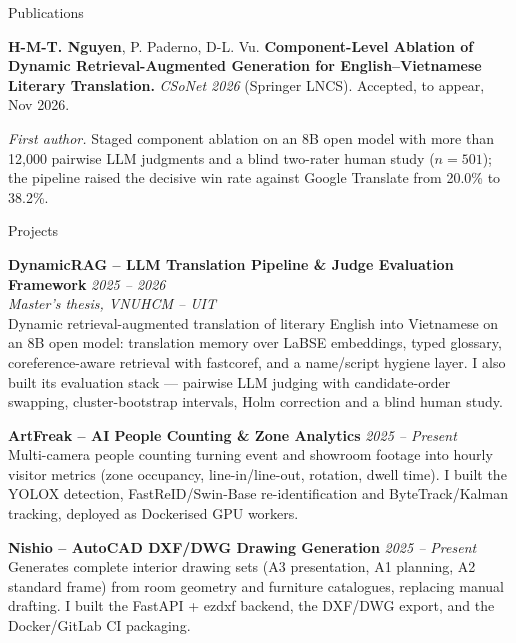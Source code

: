 \documentclass{resume} %
\begin{document}

\begin{rSection}{Publications}

{\bf H-M-T. Nguyen}, P. Paderno, D-L. Vu. \textbf{Component-Level Ablation of Dynamic Retrieval-Augmented Generation for English--Vietnamese Literary Translation.} \textit{CSoNet 2026} (Springer LNCS). Accepted, to appear, Nov 2026.
\smallskip

{\textit{First author.}} Staged component ablation on an 8B open model with more than 12{,}000 pairwise LLM judgments and a blind two-rater human study ($n{=}501$); the pipeline raised the decisive win rate against Google Translate from 20.0\% to 38.2\%.

\end{rSection}


\begin{rSection}{Projects}

{\bf DynamicRAG -- LLM Translation Pipeline \& Judge Evaluation Framework} \hfill {\em 2025 -- 2026} \\
{\textit{Master's thesis, VNUHCM -- UIT}} \\
Dynamic retrieval-augmented translation of literary English into Vietnamese on an 8B open model: translation memory over LaBSE embeddings, typed glossary, coreference-aware retrieval with fastcoref, and a name/script hygiene layer. I also built its evaluation stack --- pairwise LLM judging with candidate-order swapping, cluster-bootstrap intervals, Holm correction and a blind human study.\vspace{0.3em}

{\bf ArtFreak -- AI People Counting \& Zone Analytics} \hfill {\em 2025 -- Present} \\
Multi-camera people counting turning event and showroom footage into hourly visitor metrics (zone occupancy, line-in/line-out, rotation, dwell time). I built the YOLOX detection, FastReID/Swin-Base re-identification and ByteTrack/Kalman tracking, deployed as Dockerised GPU workers.\vspace{0.3em}

{\bf Nishio -- AutoCAD DXF/DWG Drawing Generation} \hfill {\em 2025 -- Present} \\
Generates complete interior drawing sets (A3 presentation, A1 planning, A2 standard frame) from room geometry and furniture catalogues, replacing manual drafting. I built the FastAPI + ezdxf backend, the DXF/DWG export, and the Docker/GitLab CI packaging.

\end{rSection}
\end{document}

